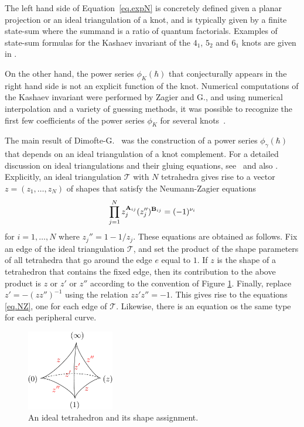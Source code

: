 \documentclass[12pt]{amsart}
\theoremstyle{definition}
\def\printname#1{
        \if\draft y
                \smash{\makebox[0pt]{\hspace{-0.5in}
                        \raisebox{8pt}{\tt\tiny #1}}}
        \fi
}
\def\lbl#1{\label{#1}\printname{#1}}
\def\calT{\mathcal T}
\newcommand{\mb}{\mathbf}
\begin{document}
The left hand side of Equation~\eqref{eq.expN} is concretely
defined given a planar projection or an ideal triangulation of a knot,
and is typically given by a finite state-sum where the summand is a ratio
of quantum factorials. Examples of state-sum formulas for the Kashaev invariant
of the $4_1$, $5_2$ and $6_1$ knots are given in \cite[(2.2)-(2.4)]{K97}.

On the other hand, the power series $\phi_K(\hbar)$ that conjecturally appears 
in the right hand side is not an explicit function of the knot. 
Numerical computations of the Kashaev invariant were performed by Zagier and 
G., and using numerical interpolation and a variety of guessing methods, it 
was possible to recognize the first few coefficients of the power series 
$\phi_K$ for several knots~\cite{GZ1}.

The main result of Dimofte-G.~\cite{DG} was the construction of a power series 
$\phi_{\gamma}(\hbar)$ that depends on an ideal triangulation of a knot 
complement. For a detailed discussion on ideal triangulations and their 
gluing equations, see~\cite{Th,NZ} and also \cite[Sec.1.2]{DG}.
Explicitly, an ideal triangulation $\calT$ with $N$ tetrahedra
gives rise to a vector $z=(z_1,\dots,z_N)$ of shapes that satisfy the 
Neumann-Zagier equations 
$$
\lbl{eq.NZ}
\prod_{j=1}^N z_j^{\mb A_{ij}} (z_j'')^{\mb B_{ij}}=(-1)^{\nu_i}
$$
for $i=1,\dots,N$ where $z_j''=1-1/z_j$. These equations are obtained as 
follows. Fix an edge of the ideal triangulation $\calT$, and set the
product of the shape parameters of all tetrahedra that go around the edge $e$
equal to $1$. If $z$ is the shape of a tetrahedron that contains the fixed 
edge, then its contribution to the above product is $z$ or $z'$ or $z''$ 
according to the convention of Figure \ref{fig.tet}. Finally, replace
$z'=-(z z'')^{-1}$ using the relation $z z' z'' = -1$. This gives rise
to the equations \eqref{eq.NZ}, one for each edge of $\calT$. Likewise,
there is an equation os the same type for each peripheral curve.

\begin{figure}[htb]
\includegraphics[width=1.5in]{draws/tet}
\caption{An ideal tetrahedron and its shape assignment.}
\label{fig.tet}
\end{figure}
\end{document}
